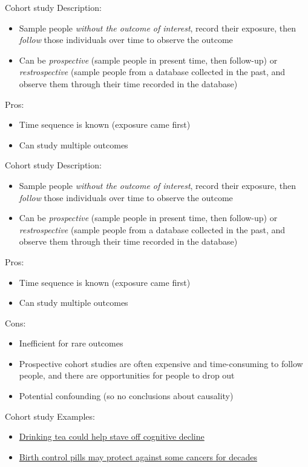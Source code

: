 \documentclass[10pt,t]{beamer}
\begin{document}
\begin{frame}{Cohort study}
Description:
\begin{itemize}
	\item Sample people \textit{without the outcome of interest}, record their exposure, then \textit{follow} those individuals over time to observe the outcome
	\item Can be \textit{prospective} (sample people in present time, then follow-up) or \textit{restrospective} (sample people from a database collected in the past, and observe them through their time recorded in the database)
\end{itemize}
Pros:
\begin{itemize}
	\item Time sequence is known (exposure came first)
	\item Can study multiple outcomes 
\end{itemize}
\end{frame}

\begin{frame}{Cohort study}
Description:
\begin{itemize}
	\item Sample people \textit{without the outcome of interest}, record their exposure, then \textit{follow} those individuals over time to observe the outcome
	\item Can be \textit{prospective} (sample people in present time, then follow-up) or \textit{restrospective} (sample people from a database collected in the past, and observe them through their time recorded in the database)
\end{itemize}
Pros:
\begin{itemize}
	\item Time sequence is known (exposure came first)
	\item Can study multiple outcomes 
\end{itemize}
Cons:
\begin{itemize}
	\item Inefficient for rare outcomes
	\item Prospective cohort studies are often expensive and time-consuming to follow people, and there are opportunities for people to drop out
	\item Potential confounding (so no conclusions about causality)
\end{itemize}
\end{frame}

\begin{frame}[c]{Cohort study}
Examples:
\vspace{0.3cm}

\begin{itemize}
	\item \href{https://www.medicalnewstoday.com/articles/316619.php}{\color{cyan} Drinking tea could help stave off cognitive decline}
	\item \href{https://www.medicalnewstoday.com/articles/316565.php}{\color{cyan} Birth control pills may protect against some cancers for decades}
\end{itemize}



\end{frame}
\end{document}
